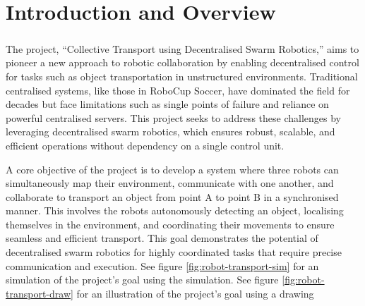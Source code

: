 \chapter{Introduction and Overview}
\paragraph*{}
The project, “Collective Transport using Decentralised Swarm Robotics,” aims to pioneer a new approach to robotic collaboration by enabling decentralised control for tasks such as object transportation in unstructured environments. Traditional centralised systems, like those in RoboCup Soccer, have dominated the field for decades but face limitations such as single points of failure and reliance on powerful centralised servers. This project seeks to address these challenges by leveraging decentralised swarm robotics, which ensures robust, scalable, and efficient operations without dependency on a single control unit.
 
A core objective of the project is to develop a system where three robots can simultaneously map their environment, communicate with one another, and collaborate to transport an object from point A to point B in a synchronised manner. This involves the robots autonomously detecting an object, localising themselves in the environment, and coordinating their movements to ensure seamless and efficient transport. This goal demonstrates the potential of decentralised swarm robotics for highly coordinated tasks that require precise communication and execution. See figure \ref{fig:robot-transport-sim} for an simulation of the project's goal using the simulation.
See figure \ref{fig:robot-transport-draw} for an illustration of the project's goal using a drawing 

